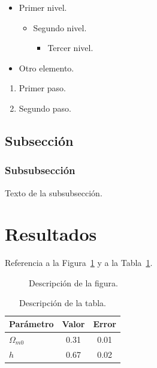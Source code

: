 \documentclass[letterpaper, 12pt]{article}
\begin{document}
            \begin{itemize}
                \item Primer nivel.
                    \begin{itemize}
                        \item Segundo nivel.
                            \begin{itemize}
                                \item Tercer nivel.
                            \end{itemize}
                    \end{itemize}
                \item Otro elemento.
            \end{itemize}

            \begin{enumerate}
                \item Primer paso.
                \item Segundo paso.
            \end{enumerate}

        \subsection{Subsección}
            \subsubsection{Subsubsección}
                Texto de la subsubsección.

    \section{Resultados}
        Referencia a la Figura~\ref{fig:ejemplo} y a la Tabla~\ref{tab:ejemplo}.

        \begin{figure}[H]
            \centering
            \caption{Descripción de la figura.}
            \label{fig:ejemplo}
        \end{figure}

        \begin{table}[H]
            \centering
            \caption{Descripción de la tabla.}
            \label{tab:ejemplo}
            \begin{tabular}{lcc}
                \toprule
                Parámetro & Valor & Error \\
                \midrule
                $\Omega_{m0}$ & 0.31 & 0.01 \\
                $h$           & 0.67 & 0.02 \\
                \bottomrule
            \end{tabular}
        \end{table}
\end{document}
